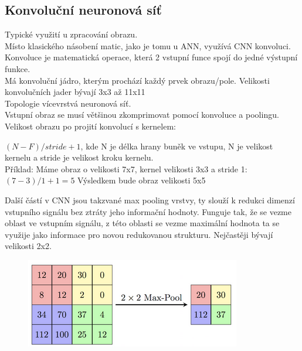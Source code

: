 \subsection{Konvoluční neuronová síť}
Typické využití u zpracování obrazu.\\
Místo klasického násobení matic, jako je tomu u ANN, využívá CNN konvoluci.\\
Konvoluce je matematická operace, která 2 vstupní funce spojí do jedné výstupní funkce.\\
Má konvoluční jádro, kterým prochází každý prvek obrazu/pole. Velikosti konvolučních jader bývají 3x3 až 11x11\\
Topologie vícevrstvá neuronová síť.\\
Vstupní obraz se musí většinou zkomprimovat pomocí konvoluce a poolingu.\\
Velikost obrazu po projití konvolucí s kernelem:
\begin{center}
    \((N-F)/stride +1\), kde N je délka hrany buněk ve vstupu, N je velikost kernelu a stride je velikost kroku kernelu.\\
    Příklad: Máme obraz o velikosti 7x7, kernel velikosti 3x3 a stride 1:\\
    \((7-3)/1+1 = 5\) Výsledkem bude obraz velikosti 5x5
\end{center}
Další částí v CNN jsou takzvané max pooling vrstvy, ty slouží k redukci dimenzí vstupního signálu bez ztráty jeho informační hodnoty. Funguje tak, že se vezme oblast ve vstupním signálu, z této oblasti se vezme maximální hodnota ta se využije jako informace pro novou redukovanou strukturu. Nejčastěji bývají velikosti 2x2.\\
\begin{figure}[h!]
    \centering
    \includegraphics[scale = 0.5]{images/MaxPooling.png}
\end{figure}


